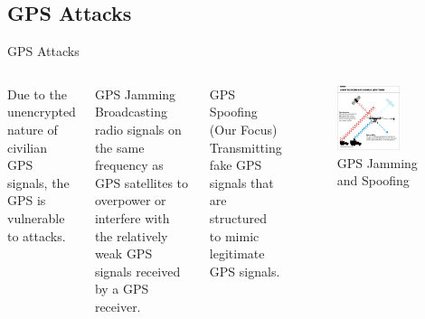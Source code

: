 \documentclass[aspectratio=169, 8pt]{beamer}
\begin{document}

\subsection{GPS Attacks}
\begin{frame}{GPS Attacks}


\begin{columns}

Due to the unencrypted nature of civilian GPS signals, the GPS is vulnerable to attacks.

\begin{block}{GPS Jamming}
    Broadcasting radio signals on the same frequency as GPS satellites  to overpower or interfere with the relatively weak GPS signals received by a GPS receiver.
\end{block}

\begin{block}{GPS Spoofing (Our Focus)}
    Transmitting fake GPS signals that are structured to mimic legitimate GPS signals.
\end{block}


\begin{figure}
    \centering
    \includegraphics[width = 0.7\textwidth]{images/jamming.png}
    \caption{GPS Jamming and Spoofing}
    \label{fig:enter-label}
\end{figure}

\end{columns}






    
\end{frame}
\end{document}
